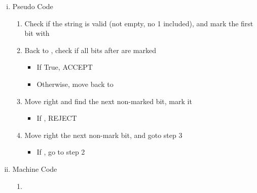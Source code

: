 \documentclass{article}
\def\math#1{$#1$}
\newcommand{\xmark}{\text{\ding{55}}}
\begin{document}
\begin{enumerate}[i)]
    \item Pseudo Code
        \begin{enumerate}[1)]
            \item Check if the string is valid (not empty, no 1 included), and mark the first bit with \xmark
            \item Back to \xmark, check if all bits after \xmark are marked
                \begin{itemize}
                    \item If True, ACCEPT
                    \item Otherwise, move back to \xmark
                \end{itemize}
            \item Move right and find the next non-marked bit, mark it
                \begin{itemize}
                    \item If \textvisiblespace, REJECT
                \end{itemize}
            \item Move right the next non-mark bit, and goto step 3
                \begin{itemize}
                    \item If \textvisiblespace, go to step 2
                \end{itemize}
        \end{enumerate}
    \item Machine Code
        \begin{enumerate}[1)]
            \item 
                \begin{figure}[ht] %
                    \centering %
\end{figure}
\end{enumerate}
\end{enumerate}
\end{document}
